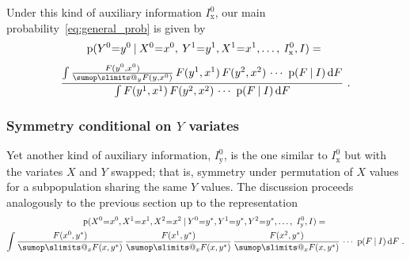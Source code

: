 \documentclass[a4paper,12pt,%
onecolumn,oneside,article,%
british%
]{memoir}
\makeatletter
\def\sum{\DOTSI\sumop\slimits@}
\newcommand*{\di}{\mathop{}\!\mathrm{d}}%
\newcommand*{\p}{\mathrm{p}}%
\renewcommand*{\|}[1][]{\nonscript\:#1\vert\nonscript\:\mathopen{}}
\newcommand*{\mo}[1][=]{\mathclose{}\mathord{\nonscript\mkern0.5mu#1\nonscript\mkern0.5mu}\mathopen{}}
\newcommand*{\Ix}{I_{\textrm{x}}}
\newcommand*{\Iy}{I_{\textrm{y}}}
\makeatother
\begin{document}
Under this kind of auxiliary information $\Ix^{0}$, our main probability~\eqref{eq:general_prob} is given by
\begin{multline}
  \label{eq:general_prob_partialexch}
  \p(Y^{0}\mo y^{0} \|
  X^{0}\mo x^{0},\: Y^{1}\mo y^{1},X^{1}\mo x^{1},\dotsc,\: \Ix^{0},I)
  =
{}\\[\jot]
  \frac{
    \int \frac{F(y^{0},x^{0})}{\sum_{y}F(y,x^{0})}\, F(y^{1},x^{1})\, F(y^{2},x^{2})\,\dotsm\  \p(F  \|I) \di F
  }{
    \int F(y^{1},x^{1})\, F(y^{2},x^{2})\,\dotsm\  \p(F  \|I) \di F
  } \ .
\end{multline}

\subsubsection{Symmetry conditional on $Y$ variates}
\label{sec:unit0_condY}

Yet another kind of auxiliary information, $\Iy^{0}$, is the one similar to $\Ix^{0}$ but with the variates $X$ and $Y$ swapped; that is, symmetry under permutation of $X$ values for a subpopulation sharing the same $Y$ values. The discussion proceeds analogously to the previous section up to the representation
  \begin{multline}
    \label{eq:deFinetti_integral_partialY}
    \p(X^{0}\mo x^{0}, X^{1}\mo x^{1}, X^{2}\mo x^{2}
    \|
    Y^{0}\mo y^{*}, Y^{1}\mo y^{*},Y^{2}\mo y^{*},
    \dotsc,\  \Iy^{0},I) =
    {}\\
    \int
    \frac{F(x^{0},y^{*})}{\sum_{x}F(x,y^{*})}\,
    \frac{F(x^{1},y^{*})}{\sum_{x}F(x,y^{*})}\,
    \frac{F(x^{2},y^{*})}{\sum_{x}F(x,y^{*})}
    \,\dotsm\ \p(F  \|I) \di F \ .
  \end{multline}
\end{document}
